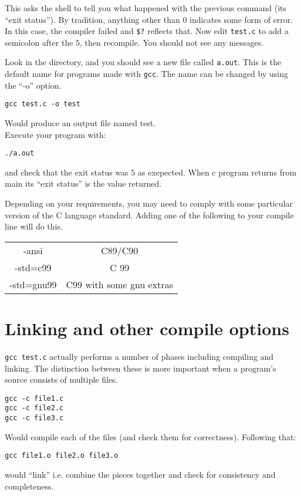 This asks the shell to tell you what happened with the previous command (its ``exit status'').
By tradition, anything other than $0$ indicates some form of error.
In this case, the compiler failed and \verb!$?! reflects that.
Now edit \texttt{test.c} to add a semicolon after the $5$, then recompile.
You should not see any messages.

Look in the directory, and you should see a new file called \texttt{a.out}.
This is the default name for programs made with \texttt{gcc}. The name can be changed
by using the ``-o'' option. 

\begin{verbatim}
gcc test.c -o test
\end{verbatim}
Would produce an output file named test.
\\
Execute your program with:
\begin{verbatim}
./a.out 
\end{verbatim}
and check that the exit status was $5$ as exepected. When c program returns from main its ``exit status'' is the value returned.

Depending on your requirements, you may need to comply with some particular version of the C language standard.
Adding one of the following to your compile line will do this.

\begin{tabular}{c|c}
-ansi & C89/C90 \\
-std=c99 & C 99 \\
-std=gnu99 & C99 with some gnu extras\\
\end{tabular}


\section{Linking and other compile options}
\texttt{gcc test.c} actually performs a number of phases including compiling and linking.
The distinction between these is more important when a program's source consists of multiple 
files.
\begin{verbatim}
gcc -c file1.c
gcc -c file2.c
gcc -c file3.c
\end{verbatim}
Would compile each of the files (and check them for correctness).
Following that:
\begin{verbatim}
gcc file1.o file2.o file3.o 
\end{verbatim}
would ``link'' i.e. combine the pieces together and check for consistency and completeness.

